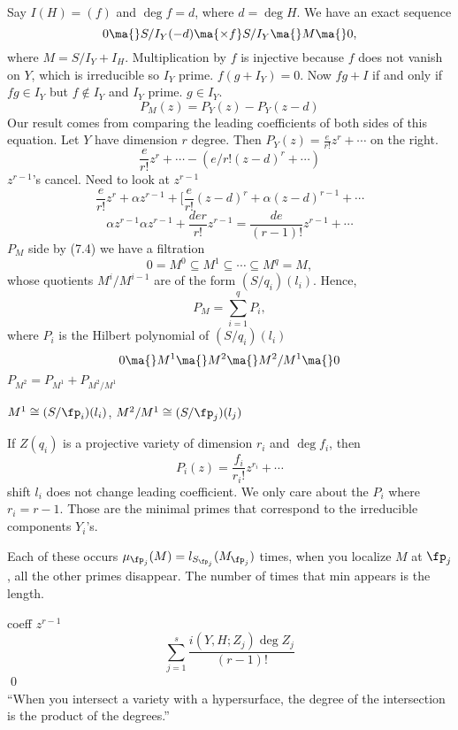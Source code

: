 \pf Say $I(H)= (f)$ and $\deg f= d$, where $d= \deg H$. We have an exact sequence
	\[
	0 \ma{} S/I_Y(-d) \ma{\times f} S/I_Y \ma{} M \ma{} 0,
	\]
where $M= S/I_Y+I_H$. Multiplication by $f$ is injective because $f$ does not vanish on $Y$, which is irreducible so $I_Y$ prime. $f(g+I_Y)=0$. Now $fg+ I$ if and only if $fg \in I_Y$ but $f \notin I_Y$ and $I_Y$ prime. $g \in I_Y$. 
	\[
	P_M(z)= P_Y(z) - P_Y(z-d)
	\]
Our result comes from comparing the leading coefficients of both sides of this equation. Let $Y$ have dimension $r$ degree. Then $P_Y(z)= \frac{e}{r!} z^r + \cdots$ on the right. 
	\[
	\frac{e}{r!} z^r + \cdots - ( e/r! (z-d)^r + \cdots)
	\]
$z^{r-1}$'s cancel. Need to look at $z^{r-1}$
	\[
	\frac{e}{r!} z^r + \alpha z^{r-1} + [ \frac{e}{r!} (z-d)^r + \alpha(z-d)^{r-1} + \cdots
	\]
	\[
	\alpha z^{r-1} \alpha z^{r-1} + \dfrac{der}{r!} z^{r-1}= \dfrac{de}{(r-1)!} z^{r-1} + \cdots 
	\]
$P_M$ side by (7.4) we have a filtration	
	\[
	0= M^0 \subseteq M^1 \subseteq \cdots \subseteq M^q= M,
	\]
whose quotients $M^i/M^{i-1}$ are of the form $(S/q_i)(l_i)$. Hence, 
	\[
	P_M= \sum_{i=1}^q P_i,
	\]
where $P_i$ is the Hilbert polynomial of $(S/q_i)(l_i)$
	\[
	0 \ma{} M^1 \ma{} M^2 \ma{} M^2/M^1 \ma{} 0
	\]
$P_{M^2}= P_{M^1} + P_{M^2/M^1}$

$M^1 \cong (S/\fp_i)(l_i)$, $M^2/M^1 \cong (S/\fp_j)(l_j)$

If $Z(q_i)$ is a projective variety of dimension $r_i$ and $\deg f_i$, then	
	\[
	P_i(z)= \frac{f_i}{r_i!} z^{r_i} + \cdots
	\]
shift $l_i$ does not change leading coefficient. We only care about the $P_i$ where $r_i= r-1$. Those are the minimal primes that correspond to the irreducible components $Y_i$'s. 

Each of these occurs $\mu_{\fp_j}(M)= l_{S_{\fp_j}}(M_{\fp_j})$ times, when you localize $M$ at $\fp_j$, all the other primes disappear. The number of times that min appears is the length.

coeff $z^{r-1}$
	\[
	\sum_{j=1}^s \dfrac{i(Y,H; Z_j) \deg Z_j}{(r-1)!}
	\]
\qed \\



``When you intersect a variety with a hypersurface, the degree of the intersection is the product of the degrees.'' 









